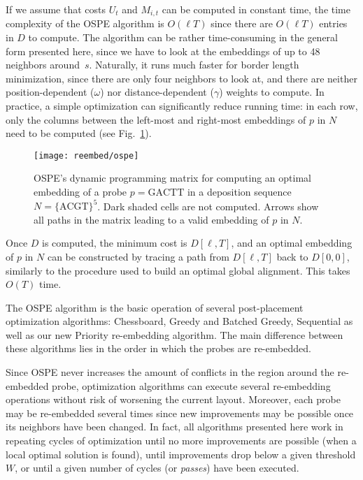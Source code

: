 If we assume that costs $U_t$ and $M_{i,t}$ can be computed in constant time,
the time complexity of the OSPE algorithm is $O(\ell T)$ since there are
$O(\ell T)$ entries in $D$ to compute. The algorithm can be rather
time-consuming in the general form presented here, since we have to look at the
embeddings of up to 48 neighbors around~$s$. Naturally, it runs much faster for
border length minimization, since there are only four neighbors to look at, and
there are neither position-dependent ($\omega$) nor distance-dependent
($\gamma$) weights to compute. In practice, a simple optimization can
significantly reduce running time: in each row, only the columns between the
left-most and right-most embeddings of $p$ in $N$ need to be computed (see
Fig.~\ref{fig:ospe}).

\begin{figure}[t]
\texttt{[image: reembed/ospe]}
\caption{\label{fig:ospe}%
  OSPE's dynamic programming matrix for computing an optimal embedding of a
  probe $p=\text{GACTT}$ in a deposition sequence $N=\text{\{ACGT\}}^5$. Dark
  shaded cells are not computed. Arrows show all paths in the matrix leading to
  a valid embedding of $p$ in $N$.}
\end{figure}

Once $D$ is computed, the minimum cost is $D[\ell,T]$, and an optimal embedding
of $p$ in $N$ can be constructed by tracing a path from $D[\ell,T]$ back to
$D[0,0]$, similarly to the procedure used to build an optimal global alignment.
This takes $O(T)$ time.

The OSPE algorithm is the basic operation of several post-placement optimization
algorithms: Chessboard, Greedy and Batched Greedy, Sequential as well as our new
Priority re-embedding algorithm. The main difference between these algorithms
lies in the order in which the probes are re-embedded.

Since OSPE never increases the amount of conflicts in the region around the
re-embedded probe, optimization algorithms can execute several re-embedding
operations without risk of worsening the current layout. Moreover, each probe
may be re-embedded several times since new improvements may be possible once its
neighbors have been changed. In fact, all algorithms presented here work in
repeating cycles of optimization until no more improvements are possible (when a
local optimal solution is found), until improvements drop below a given
threshold $W$, or until a given number of cycles (or \emph{passes}) have been
executed.

